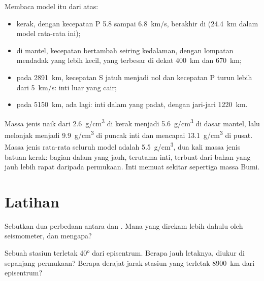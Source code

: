Membaca model itu dari atas:
\begin{itemize}
  \item kerak, dengan kecepatan P 5.8 sampai \qty{6.8}{km/s}, berakhir di 
        (\qty{24.4}{km} dalam model rata-rata ini);
  \item di mantel, kecepatan bertambah seiring kedalaman, dengan lompatan
        mendadak yang lebih kecil, yang terbesar di dekat \qty{400}{km} dan
        \qty{670}{km};
  \item pada \qty{2891}{km}, kecepatan S jatuh menjadi nol dan kecepatan P
        turun lebih dari \qty{5}{km/s}: inti luar yang cair;
  \item pada \qty{5150}{km},  ada lagi: inti dalam yang padat,
        dengan jari-jari \qty{1220}{km}.
\end{itemize}

Massa jenis naik dari \qty{2.6}{g/cm^3} di kerak menjadi
\qty{5.6}{g/cm^3} di dasar mantel, lalu melonjak menjadi
\qty{9.9}{g/cm^3} di puncak inti dan mencapai \qty{13.1}{g/cm^3} di
pusat. Massa jenis rata-rata seluruh model adalah \qty{5.5}{g/cm^3}, dua kali
massa jenis batuan kerak: bagian dalam yang jauh, terutama inti, terbuat dari
bahan yang jauh lebih rapat daripada permukaan. Inti memuat sekitar sepertiga
massa Bumi.

\section{Latihan}

\begin{exercise}[$\star$]\label{exo:g11:seismic-structure:1}
Sebutkan dua perbedaan antara  dan . Mana yang direkam
lebih dahulu oleh seismometer, dan mengapa?
\end{exercise}

\begin{exercise}[$\star$]\label{exo:g11:seismic-structure:2}
Sebuah stasiun terletak \ang{40} dari episentrum. Berapa jauh letaknya, diukur di
sepanjang permukaan? Berapa derajat jarak stasiun yang terletak \qty{8900}{km}
dari episentrum?
\end{exercise}

